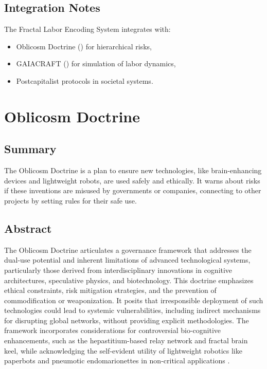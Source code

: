 \documentclass[11pt,oneside]{memoir}
\theoremstyle{plain}
\begin{document}
\section{Integration Notes}
The Fractal Labor Encoding System integrates with:
\begin{itemize}
    \item Oblicosm Doctrine () for hierarchical risks,
    \item GAIACRAFT () for simulation of labor dynamics,
    \item Postcapitalist protocols in societal systems.
\end{itemize}

\chapter{Oblicosm Doctrine}
\label{sec:oblicosm_doctrine}

\section{Summary}
The Oblicosm Doctrine is a plan to ensure new technologies, like brain-enhancing devices and lightweight robots, are used safely and ethically. It warns about risks if these inventions are misused by governments or companies, connecting to other projects by setting rules for their safe use.

\section{Abstract}
The Oblicosm Doctrine articulates a governance framework that addresses the dual-use potential and inherent limitations of advanced technological systems, particularly those derived from interdisciplinary innovations in cognitive architectures, speculative physics, and biotechnology. This doctrine emphasizes ethical constraints, risk mitigation strategies, and the prevention of commodification or weaponization. It posits that irresponsible deployment of such technologies could lead to systemic vulnerabilities, including indirect mechanisms for disrupting global networks, without providing explicit methodologies. The framework incorporates considerations for controversial bio-cognitive enhancements, such as the hepastitium-based relay network and fractal brain keel, while acknowledging the self-evident utility of lightweight robotics like paperbots and pneumotic endomarionettes in non-critical applications \cite{ai_ethics, ai_ethics_framework}.
\end{document}
